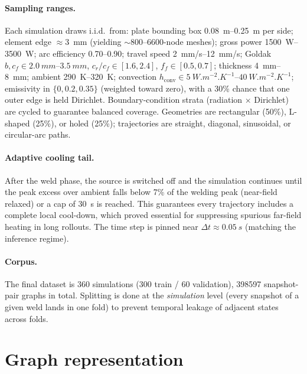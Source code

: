 \documentclass[11pt]{article}
\theoremstyle{definition}
\begin{document}
\paragraph{Sampling ranges.} Each simulation draws i.i.d.\ from:
plate bounding box \SIrange{0.08}{0.25}{m} per side; element edge $\approx$\SI{3}{mm}
(yielding $\sim$\numrange{800}{6600}-node meshes); gross power
\SIrange{1500}{3500}{W}; arc efficiency \numrange{0.70}{0.90}; travel speed
\SIrange{2}{12}{mm/s}; Goldak $b,c_f\in\SIrange{2.0}{3.5}{mm}$,
$c_r/c_f\in[1.6,2.4]$, $f_f\in[0.5,0.7]$; thickness \SIrange{4}{8}{mm}; ambient
\SIrange{290}{320}{K}; convection $h_{\mathrm{conv}}\in\SIrange{5}{40}{W.m^{-2}.K^{-1}}$;
emissivity in $\{0,0.2,0.35\}$ (weighted toward zero), with a 30\% chance that one outer
edge is held Dirichlet. Boundary-condition strata (radiation $\times$ Dirichlet) are
cycled to guarantee balanced coverage. Geometries are rectangular (50\%), L-shaped
(25\%), or holed (25\%); trajectories are straight, diagonal, sinusoidal, or
circular-arc paths.

\paragraph{Adaptive cooling tail.} After the weld phase, the source is switched off and
the simulation continues until the peak excess over ambient falls below 7\% of the
welding peak (near-field relaxed) or a cap of \SI{30}{s} is reached. This guarantees
every trajectory includes a complete local cool-down, which proved essential for
suppressing spurious far-field heating in long rollouts. The time step is pinned near
$\Delta t\approx\SI{0.05}{s}$ (matching the inference regime).

\paragraph{Corpus.} The final dataset is \num{360} simulations (\num{300} train /
\num{60} validation), \num{398597} snapshot-pair graphs in total. Splitting is done at
the \emph{simulation} level (every snapshot of a given weld lands in one fold) to
prevent temporal leakage of adjacent states across folds.

\section{Graph representation}
\label{sec:graph}
\end{document}
